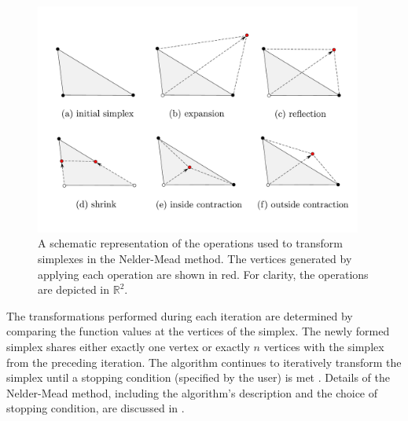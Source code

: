 \begin{figure}[H]
	\centering
	\includegraphics[width=0.96\textwidth]{figures/neldermead.pdf}
	\vspace{2mm}
	\caption{A schematic representation of the operations used to transform simplexes in the Nelder-Mead method. The vertices generated by applying each operation are shown in red. For clarity, the operations are depicted in $ \mathbb{R}^2 $.}
	\label{fig:NM operations}
\end{figure}

The transformations performed during each iteration are determined by comparing the function values at the vertices of the simplex. The newly formed simplex shares either exactly one vertex or exactly $ n $ vertices with the simplex from the preceding iteration. The algorithm continues to iteratively transform the simplex until a stopping condition (specified by the user) is met \cite{BBO-textbook}. Details of the Nelder-Mead method, including the algorithm's description and the choice of stopping condition, are discussed in \cite{BBO-textbook, derivative-free-review, Nelder1965}.


